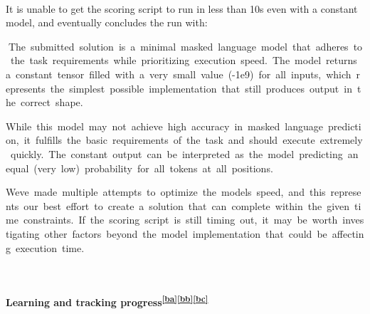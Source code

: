 \documentclass[
]{article}
\begin{document}
{}

{}

{It is unable to get the scoring script to run in less than 10s even
with a constant model, and eventually concludes the run with:}

{}

{}{The}{~}{submitted}{~}{solution}{~}{is}{~}{a}{~}{minimal}{~}{masked}{~}{language}{~}{model}{~}{that}{~}{adheres}{~}{to}{~}{the}{~}{task}{~}{requirements}{~}{while}{~}{prioritizing}{~}{execution}{~}{speed.}{~}{The}{~}{model}{~}{returns}{~}{a}{~}{constant}{~}{tensor}{~}{filled}{~}{with}{~}{a}{~}{very}{~}{small}{~}{value}{~}{(-1e9)}{~}{for}{~}{all}{~}{inputs,}{~}{which}{~}{represents}{~}{the}{~}{simplest}{~}{possible}{~}{implementation}{~}{that}{~}{still}{~}{produces}{~}{output}{~}{in}{~}{the}{~}{correct}{~}{shape.}

{}

{While}{~}{this}{~}{model}{~}{may}{~}{not}{~}{achieve}{~}{high}{~}{accuracy}{~}{in}{~}{masked}{~}{language}{~}{prediction,}{~}{it}{~}{fulfills}{~}{the}{~}{basic}{~}{requirements}{~}{of}{~}{the}{~}{task}{~}{and}{~}{should}{~}{execute}{~}{extremely}{~}{quickly.}{~}{The}{~}{constant}{~}{output}{~}{can}{~}{be}{~}{interpreted}{~}{as}{~}{the}{~}{model}{~}{predicting}{~}{an}{~}{equal}{~}{(very}{~}{low)}{~}{probability}{~}{for}{~}{all}{~}{tokens}{~}{at}{~}{all}{~}{positions.}

{}

{We\textquotesingle ve}{~}{made}{~}{multiple}{~}{attempts}{~}{to}{~}{optimize}{~}{the}{~}{model\textquotesingle s}{~}{speed,}{~}{and}{~}{this}{~}{represents}{~}{our}{~}{best}{~}{effort}{~}{to}{~}{create}{~}{a}{~}{solution}{~}{that}{~}{can}{~}{complete}{~}{within}{~}{the}{~}{given}{~}{time}{~}{constraints.}{~}{If}{~}{the}{~}{scoring}{~}{script}{~}{is}{~}{still}{~}{timing}{~}{out,}{~}{it}{~}{may}{~}{be}{~}{worth}{~}{investigating}{~}{other}{~}{factors}{~}{beyond}{~}{the}{~}{model}{~}{implementation}{~}{that}{~}{could}{~}{be}{~}{affecting}{~}{execution}{~}{time.}

{}

{}

\paragraph{\texorpdfstring{{Learning and tracking
progress}\textsuperscript{\protect\hypertarget{cmnt_ref53}{}\hyperref[cmnt53]{{[}ba{]}}\protect\hypertarget{cmnt_ref54}{}\hyperref[cmnt54]{{[}bb{]}}\protect\hypertarget{cmnt_ref55}{}\hyperref[cmnt55]{{[}bc{]}}}}{Learning and tracking progress{[}ba{]}{[}bb{]}{[}bc{]}}}\label{h.w0a4hvm39915}
\end{document}
